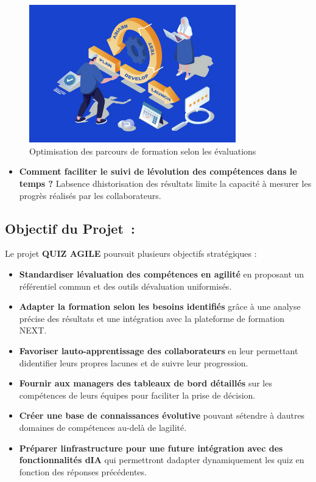 \documentclass[12pt,a4paper,twoside]{report}
\begin{document}
\begin{figure}[H]
\centering
\includegraphics[width=0.8\textwidth]{latex_media/media/image7.jpeg}
\caption{Optimisation des parcours de formation selon les évaluations}
\label{fig:optimisation-parcours}
\end{figure}

\begin{itemize}
\item
  \textbf{Comment
  faciliter le suivi de l\textquotesingle évolution des compétences dans
  le temps ?} L\textquotesingle absence d\textquotesingle historisation
  des résultats limite la capacité à mesurer les progrès réalisés par
  les collaborateurs.
\end{itemize}

\hypertarget{objectif-du-projet}{%
\subsection{Objectif du Projet~:~}\label{objectif-du-projet}}

Le projet \textbf{QUIZ AGILE} poursuit plusieurs objectifs stratégiques
:

\begin{itemize}
\item
  \textbf{Standardiser l\textquotesingle évaluation des compétences en
  agilité} en proposant un référentiel commun et des outils
  d\textquotesingle évaluation uniformisés.
\item
  \textbf{Adapter la formation selon les besoins identifiés} grâce à une
  analyse précise des résultats et une intégration avec la plateforme de
  formation NEXT.
\item
  \textbf{Favoriser l\textquotesingle auto-apprentissage des
  collaborateurs} en leur permettant d\textquotesingle identifier leurs
  propres lacunes et de suivre leur progression.
\item
  \textbf{Fournir aux managers des tableaux de bord détaillés} sur les
  compétences de leurs équipes pour faciliter la prise de décision.
\item
  \textbf{Créer une base de connaissances évolutive} pouvant
  s\textquotesingle étendre à d\textquotesingle autres domaines de
  compétences au-delà de l\textquotesingle agilité.
\item
  \textbf{Préparer l\textquotesingle infrastructure pour une future
  intégration avec des fonctionnalités d\textquotesingle IA} qui
  permettront d\textquotesingle adapter dynamiquement les quiz en
  fonction des réponses précédentes.
\end{itemize}
\end{document}
